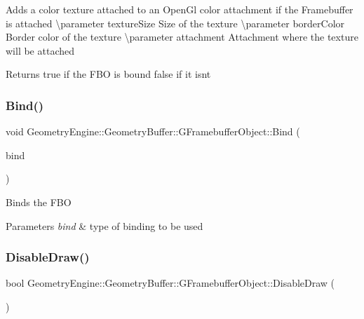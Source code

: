 Adds a color texture attached to an Open\+Gl color attachment if the Framebuffer is attached \textbackslash{}parameter texture\+Size Size of the texture \textbackslash{}parameter border\+Color Border color of the texture \textbackslash{}parameter attachment Attachment where the texture will be attached \begin{DoxyReturn}{Returns}
true if the F\+BO is bound false if it isn\textquotesingle{}t 
\end{DoxyReturn}
\mbox{\label{class_geometry_engine_1_1_geometry_buffer_1_1_g_framebuffer_object_a0608caec59adf85a55effb74f0c9c8c9}} 
\subsubsection{\texorpdfstring{Bind()}{Bind()}}
{\footnotesize\ttfamily void Geometry\+Engine\+::\+Geometry\+Buffer\+::\+G\+Framebuffer\+Object\+::\+Bind (\begin{DoxyParamCaption}\item[{G\+\_\+\+F\+R\+A\+M\+E\+B\+U\+F\+F\+E\+R\+\_\+\+B\+I\+N\+DS}]{bind }\end{DoxyParamCaption})}

Binds the F\+BO 
\begin{DoxyParams}{Parameters}
{\em bind} & type of binding to be used \\
\hline
\end{DoxyParams}
\mbox{\label{class_geometry_engine_1_1_geometry_buffer_1_1_g_framebuffer_object_a3eb30c7714c5c3f3c2ec8f85a2ec948c}} 
\subsubsection{\texorpdfstring{DisableDraw()}{DisableDraw()}}
{\footnotesize\ttfamily bool Geometry\+Engine\+::\+Geometry\+Buffer\+::\+G\+Framebuffer\+Object\+::\+Disable\+Draw (\begin{DoxyParamCaption}{ }\end{DoxyParamCaption})}

